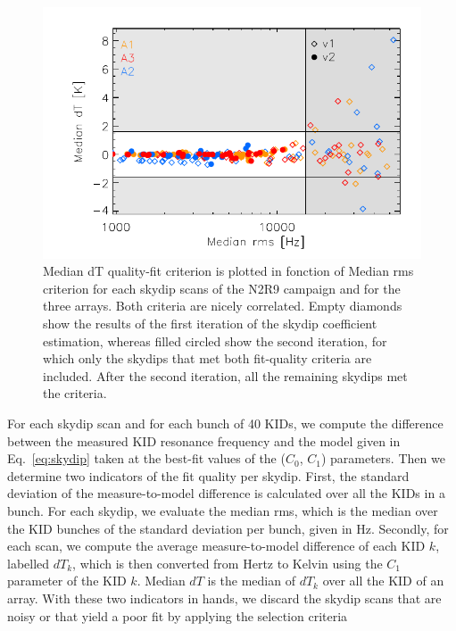 \begin{figure}[p]
\begin{center}
\includegraphics[clip=true,width=0.9\linewidth]{Figures/Opacity/plot_skydip_selection_two_crit.pdf}
\caption[N2R9 skydip scan selection.]{ Median dT quality-fit criterion is plotted in fonction of Median rms criterion for each skydip scans of the N2R9 campaign and for the three arrays. Both criteria are nicely correlated. Empty diamonds show the results of the first iteration of the skydip coefficient estimation, whereas filled circled show the second iteration, for which only the skydips that met both fit-quality criteria are included. After the second iteration, all the remaining skydips met the criteria.}
\label{fig:skydipselection}
\end{center}
\end{figure}

For each skydip scan and for each bunch of 40 KIDs, we compute the
difference between the measured KID resonance frequency and the model
given in Eq.~\ref{eq:skydip} taken at the best-fit values of the
($C_0$, $C_1$) parameters. Then we determine two indicators
of the fit quality per skydip. First, the standard deviation of the
measure-to-model difference is calculated over all the KIDs in a
bunch. For each skydip, we evaluate the median rms, which is the
median over the KID bunches of the standard deviation per bunch, given
in Hz. Secondly, for each scan, we compute the average
measure-to-model difference of each KID $k$, labelled $dT_k$, which is
then converted from Hertz to Kelvin using the $C_1$ parameter of the
KID $k$. Median $dT$ is the median of $dT_k$ over all the KID of an
array. With these two indicators in hands, we discard the skydip scans
that are noisy or that yield a poor fit by applying the selection
criteria

